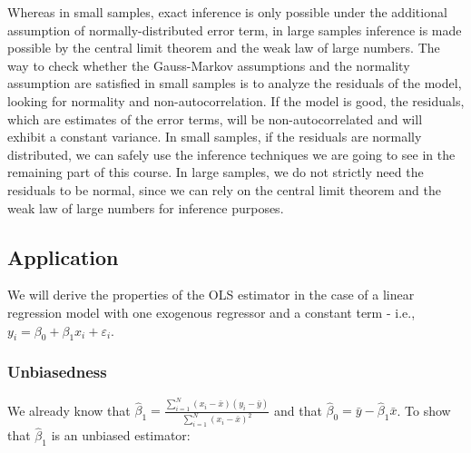 Whereas in small samples, exact inference is only possible under the additional assumption of normally-distributed error term, in large samples inference is made possible by the central limit theorem and the weak law of large numbers. The way to check whether the Gauss-Markov assumptions and the normality assumption are satisfied in small samples is to analyze the residuals of the model, looking for normality and non-autocorrelation. If the model is good, the residuals, which are estimates of the error terms, will be non-autocorrelated and will exhibit a constant variance. In small samples, if the residuals are normally distributed, we can safely use the inference techniques we are going to see in the remaining part of this course. In large samples, we do not strictly need the residuals to be normal, since we can rely on the central limit theorem and the weak law of large numbers for inference purposes.

\subsection{Application}
We will derive the properties of the OLS estimator in the case of a linear regression model with one exogenous regressor and a constant term - i.e., $y_{i}=\beta_{0}+\beta_{1} x_{i}+\varepsilon_{i}$.

\subsubsection{Unbiasedness}
We already know that $\widehat{\beta}_{1}=\frac{\sum_{i=1}^{N}\left(x_{i}-\bar{x}\right)\left(y_{i}-\bar{y}\right)}{\sum_{i=1}^{N}\left(x_{i}-\bar{x}\right)^{2}}$ and that $\widehat{\beta}_{0}=\bar{y}-\widehat{\beta}_{1} \bar{x}$. To show that $\widehat{\beta}_{1}$ is an unbiased estimator:


